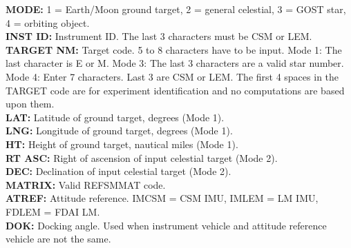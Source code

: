 \documentclass[11pt]{article} %
\begin{document}
\textbf{MODE:} 1 = Earth/Moon ground target, 2 = general celestial, 3 = GOST star, 4 = orbiting object.\\
\textbf{INST ID:} Instrument ID. The last 3 characters must be CSM or LEM.\\
 \textbf{TARGET NM:} Target code. 5 to 8 characters have to be input.  Mode 1: The last character is E or M. Mode 3: The last 3 characters are a valid star number. Mode 4: Enter 7 characters. Last 3 are CSM or LEM. The first 4 spaces in the TARGET code are for experiment identification and no computations are based upon them.\\
\textbf{LAT:} Latitude of ground target, degrees (Mode 1).\\
\textbf{LNG:} Longitude of ground target, degrees (Mode 1).\\
\textbf{HT:} Height of ground target, nautical miles (Mode 1).\\
\textbf{RT ASC:} Right of ascension of input celestial target (Mode 2).\\
\textbf{DEC:} Declination of input celestial target (Mode 2).\\
\textbf{MATRIX:} Valid REFSMMAT code.\\
\textbf{ATREF:} Attitude reference. IMCSM = CSM IMU, IMLEM = LM IMU, FDLEM = FDAI LM.\\
\textbf{DOK:} Docking angle. Used when instrument vehicle and attitude reference vehicle are not the same.\\
\newpage
\end{document}
